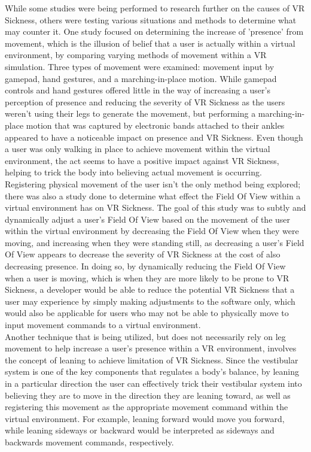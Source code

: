 \documentclass{article}
\begin{document}
While some studies were being performed to research further on the causes of VR Sickness, others were testing various situations and methods to determine what may counter it. One study focused on determining the increase of 'presence' from movement, which is the illusion of belief that a user is actually within a virtual environment, by comparing varying methods of movement within a VR simulation. Three types of movement were examined: movement input by gamepad, hand gestures, and a marching-in-place motion\cite{article1cite}. While gamepad controls and hand gestures offered little in the way of increasing a user's perception of presence and reducing the severity of VR Sickness as the users weren't using their legs to generate the movement, but performing a marching-in-place motion that was captured by electronic bands attached to their ankles appeared to have a noticeable impact on presence and VR Sickness\cite{article1cite}. Even though a user was only walking in place to achieve movement within the virtual environment, the act seems to have a positive impact against VR Sickness, helping to trick the body into believing actual movement is occurring. \\
Registering physical movement of the user isn't the only method being explored; there was also a study done to determine what effect the Field Of View within a virtual environment has on VR Sickness. The goal of this study was to subtly and dynamically adjust a user's Field Of View based on the movement of the user within the virtual environment by decreasing the Field Of View when they were moving, and increasing when they were standing still, as decreasing a user's Field Of View appears to decrease the severity of VR Sickness at the cost of also decreasing presence\cite{article3cite}. In doing so, by dynamically reducing the Field Of View when a user is moving, which is when they are more likely to be prone to VR Sickness, a developer would be able to reduce the potential VR Sickness that a user may experience by simply making adjustments to the software only, which would also be applicable for users who may not be able to physically move to input movement commands to a virtual environment. \\
Another technique that is being utilized, but does not necessarily rely on leg movement to help increase a user's presence within a VR environment, involves the concept of leaning to achieve limitation of VR Sickness. Since the vestibular system is one of the key components that regulates a body's balance, by leaning in a particular direction the user can effectively trick their vestibular system into believing they are to move in the direction they are leaning toward, as well as registering this movement as the appropriate movement command within the virtual environment. For example, leaning forward would move you forward, while leaning sideways or backward would be interpreted as sideways and backwards movement commands, respectively\cite{article5cite}. \\
\end{document}
